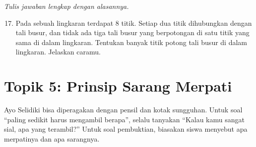 \documentclass[11pt,a4paper]{article}
\begin{document}
\textit{Tulis jawaban lengkap dengan alasannya.}
\begin{enumerate}
  \setcounter{enumi}{16}
  \item Pada sebuah lingkaran terdapat 8 titik. Setiap dua titik dihubungkan dengan tali busur,
        dan tidak ada tiga tali busur yang berpotongan di satu titik yang sama di dalam lingkaran.
        Tentukan banyak titik potong tali busur di dalam lingkaran. Jelaskan caramu.
\end{enumerate}

\newpage
\section*{Topik 5: Prinsip Sarang Merpati}

\begin{catatanguru}
Ayo Selidiki bisa diperagakan dengan pensil dan kotak sungguhan. Untuk soal ``paling sedikit harus
mengambil berapa'', selalu tanyakan ``Kalau kamu sangat sial, apa yang terambil?'' Untuk soal
pembuktian, biasakan siswa menyebut apa merpatinya dan apa sarangnya.
\end{catatanguru}
\end{document}
